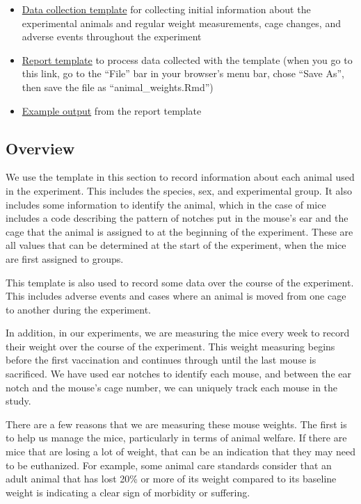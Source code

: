 \documentclass[
]{book}
\providecommand{\tightlist}{%
  \setlength{\itemsep}{0pt}\setlength{\parskip}{0pt}}
\begin{document}
\begin{itemize}
\tightlist
\item
  \href{https://github.com/csu-impactb/CODING-TEAM-BOOKDOWN-/raw/main/templates/data_collection_templates/body_weights_template.xlsx}{Data collection template} for collecting initial information about the experimental animals and regular weight measurements, cage changes, and adverse events throughout the experiment
\item
  \href{https://raw.githubusercontent.com/csu-impactb/CODING-TEAM-BOOKDOWN-/main/templates/report_templates/animal_weights.Rmd}{Report template} to process data collected with the template (when you go to this link, go to the ``File'' bar in your browser's menu bar, chose ``Save As'', then save the file as ``animal\_weights.Rmd'')
\item
  \href{https://github.com/csu-impactb/CODING-TEAM-BOOKDOWN-/raw/main/templates/report_templates/animal_weights.docx}{Example output} from the report template
\end{itemize}

\subsection{Overview}\label{overview-1}

We use the template in this section to record information about each animal
used in the experiment. This includes the species, sex, and experimental group.
It also includes some information to identify the animal, which in the case
of mice includes a code describing the pattern of notches put in the mouse's
ear and the cage that the animal is assigned to at the beginning of the
experiment. These are all values that can be determined at the start of the
experiment, when the mice are first assigned to groups.

This template is also used to record some data over the course of the
experiment. This includes adverse events and cases where an animal is moved from
one cage to another during the experiment.

In addition, in our experiments, we are measuring the mice every week to record
their weight over the course of the experiment. This weight measuring begins
before the first vaccination and continues through until the last mouse is
sacrificed. We have used ear notches to identify each mouse, and between the ear
notch and the mouse's cage number, we can uniquely track each mouse in the
study.

There are a few reasons that we are measuring these mouse weights. The first is
to help us manage the mice, particularly in terms of animal welfare. If there
are mice that are losing a lot of weight, that can be an indication that they
may need to be euthanized. For example, some animal care standards consider that
an adult animal that has lost 20\% or more of its weight compared to its baseline
weight is indicating a clear sign of morbidity or suffering.
\end{document}
